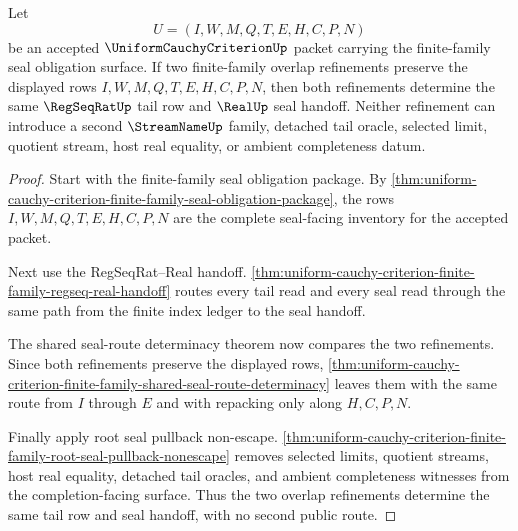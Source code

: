 \begin{theorem}
\label{thm:uniform-cauchy-criterion-finite-family-seal-overlap-determinacy}
Let
$$
U=(I,W,M,Q,T,E,H,C,P,N)
$$
be an accepted $\UniformCauchyCriterionUp$ packet carrying the finite-family seal obligation surface. If two finite-family overlap refinements preserve the displayed rows $I,W,M,Q,T,E,H,C,P,N$, then both refinements determine the same $\RegSeqRatUp$ tail row and $\RealUp$ seal handoff. Neither refinement can introduce a second $\StreamNameUp$ family, detached tail oracle, selected limit, quotient stream, host real equality, or ambient completeness datum.
\end{theorem}
\begin{proof}
Start with the finite-family seal obligation package. By \autoref{thm:uniform-cauchy-criterion-finite-family-seal-obligation-package}, the rows $I,W,M,Q,T,E,H,C,P,N$ are the complete seal-facing inventory for the accepted packet.

Next use the RegSeqRat--Real handoff. \autoref{thm:uniform-cauchy-criterion-finite-family-regseq-real-handoff} routes every tail read and every seal read through the same path from the finite index ledger to the seal handoff.

The shared seal-route determinacy theorem now compares the two refinements. Since both refinements preserve the displayed rows, \autoref{thm:uniform-cauchy-criterion-finite-family-shared-seal-route-determinacy} leaves them with the same route from $I$ through $E$ and with repacking only along $H,C,P,N$.

Finally apply root seal pullback non-escape. \autoref{thm:uniform-cauchy-criterion-finite-family-root-seal-pullback-nonescape} removes selected limits, quotient streams, host real equality, detached tail oracles, and ambient completeness witnesses from the completion-facing surface. Thus the two overlap refinements determine the same tail row and seal handoff, with no second public route.
\end{proof}

